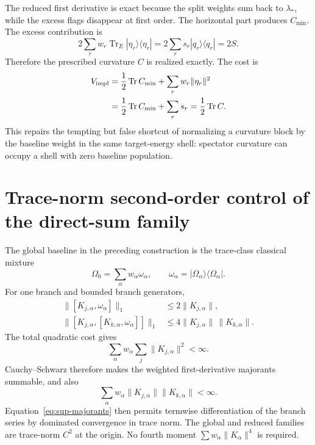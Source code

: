 \documentclass[aps,pra,preprint,nofootinbib]{revtex4-2}
\newcommand{\Tr}{\operatorname{Tr}}
\newcommand{\Omegazero}{\Omega_0}
\newcommand{\Cmin}{C_{\min}}
\newcommand{\Cker}{C}
\newcommand{\Vimpl}{V_{\rm impl}}
\begin{document}
The reduced first derivative is exact because the split weights sum back to $\lambda_*$, while the excess flags disappear at first order. The horizontal part produces $\Cmin$. The excess contribution is
\begin{equation}
 2\sum_rw_r\Tr_E|\eta_r\rangle\langle\eta_r|
 =2\sum_rs_r|q_r\rangle\langle q_r|=2S.
\end{equation}
Therefore the prescribed curvature $\Cker$ is realized exactly. The cost is
\begin{align}
 \Vimpl
 &=\frac12\Tr\Cmin+\sum_rw_r\|\eta_r\|^2\\
 &=\frac12\Tr\Cmin+\sum_rs_r
 =\frac12\Tr\Cker.
 \label{eq:sup-energycost}
\end{align}
This repairs the tempting but false shortcut of normalizing a curvature block by the baseline weight in the same target-energy shell: spectator curvature can occupy a shell with zero baseline population.

\section{Trace-norm second-order control of the direct-sum family}

The global baseline in the preceding construction is the trace-class classical mixture
\begin{equation}
 \Omegazero=\sum_\alpha w_\alpha\omega_\alpha,
 \qquad \omega_\alpha=|\Omega_\alpha\rangle\langle\Omega_\alpha|.
\end{equation}
For one branch and bounded branch generators,
\begin{align}
 \|[K_{j,\alpha},\omega_\alpha]\|_1
 &\le2\|K_{j,\alpha}\|,\\
 \|[K_{j,\alpha},[K_{k,\alpha},\omega_\alpha]]\|_1
 &\le4\|K_{j,\alpha}\|\,\|K_{k,\alpha}\|.
 \label{eq:sup-majorants}
\end{align}
The total quadratic cost gives
\begin{equation}
 \sum_\alpha w_\alpha\sum_j\|K_{j,\alpha}\|^2<\infty.
\end{equation}
Cauchy--Schwarz therefore makes the weighted first-derivative majorants summable, and also
\begin{equation}
 \sum_\alpha w_\alpha\|K_{j,\alpha}\|\|K_{k,\alpha}\|<\infty.
\end{equation}
Equation~\eqref{eq:sup-majorants} then permits termwise differentiation of the branch series by dominated convergence in trace norm. The global and reduced families are trace-norm $C^2$ at the origin. No fourth moment $\sum w_\alpha\|K_\alpha\|^4$ is required.
\end{document}
